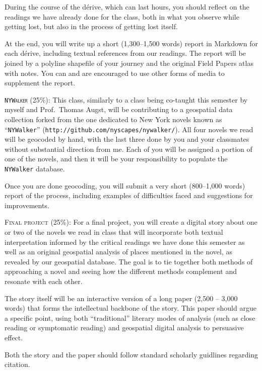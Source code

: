 \begin{description}
    During the course of the dérive, which can last hours, you should reflect
    on the readings we have already done for the class, both in what you
    observe while getting lost, but also in the process of getting lost itself.
    
    At the end, you will write up a short (1,300--1,500 words) report in
    Markdown for each dérive, including textual references from our readings.
    The report will be joined by a polyline shapefile of your journey and the
    original Field Papers atlas with notes. You can and are encouraged to use
    other forms of media to supplement the report.

  \item \textsc{\texttt{NYWalker} (25\%):} This class, similarly to a class
    being co-taught this semester by myself and Prof.\ Thomas Augst, will be
    contributing to a geospatial data collection forked from the one dedicated
    to New York novels known as “\texttt{NYWalker}”
    (\texttt{http://github.com/nyscapes/nywalker/}).  All four novels we read
    will be geocoded by hand, with the last three done by you and your
    classmates without substantial direction from me. Each of you will be
    assigned a portion of one of the novels, and then it will be your
    responsibility to populate the \texttt{NYWalker} database.

    Once you are done geocoding, you will submit a very short (800--1,000
    words) report of the process, including examples of difficulties faced and
    suggestions for improvements.

  \item \textsc{Final project (25\%):} For a final project, you will create a
    digital story about one or two of the novels we read in class that will
    incorporate both textual interpretation informed by the critical readings
    we have done this semester as well as an original geospatial analysis of
    places mentioned in the novel, as revealed by our geospatial database. The
    goal is to tie together both methods of approaching a novel and seeing how
    the different methods complement and resonate with each other.

    The story itself will be an interactive version of a long paper (2,500 --
    3,000 words) that forms the intellectual backbone of the story. This paper
    should argue a specific point, using both “traditional” literary modes of
    analysis (such as close reading or symptomatic reading) and geospatial
    digital analysis to persuasive effect.

    Both the story and the paper should follow standard scholarly guidlines
    regarding citation.

\end{description}
